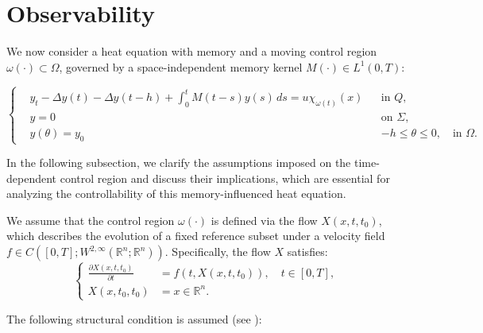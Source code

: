 \documentclass[12pt]{article}
\theoremstyle{plain}
\theoremstyle{definition}
\begin{document}
\section*{Observability}

We now consider a heat equation with memory and a moving control region $\omega(\cdot) \subset \Omega$, governed by a space-independent memory kernel $M(\cdot) \in L^1(0, T)$:

\begin{equation}
\label{eq:60}
\left\{
\begin{aligned}
    &y_t - \Delta y(t) - \Delta y(t-h) + \int_0^t M(t-s)y(s)\,ds = u\chi_{\omega(t)}(x) && \text{in } Q, \\
    &y = 0 && \text{on } \Sigma, \\
    &y(\theta) = y_0 && -h \leq \theta \leq 0,\quad \text{in } \Omega.
\end{aligned}
\right.
\end{equation}

In the following subsection, we clarify the assumptions imposed on the time-dependent control region and discuss their implications, which are essential for analyzing the controllability of this memory-influenced heat equation.

We assume that the control region $\omega(\cdot)$ is defined via the flow $X(x, t, t_0)$, which describes the evolution of a fixed reference subset under a velocity field 
$f \in C([0, T]; W^{2, \infty}(\mathbb{R}^n; \mathbb{R}^n))$. Specifically, the flow $X$ satisfies:
\[
\left\{
\begin{aligned}
\frac{\partial X(x, t, t_0)}{\partial t} &= f(t, X(x, t, t_0)), \quad t \in [0, T], \\
X(x, t_0, t_0) &= x \in \mathbb{R}^n.
\end{aligned}
\right.
\]

The following structural condition is assumed (see \cite{chaves2014null}):
\end{document}
